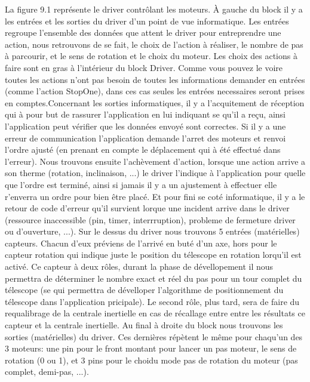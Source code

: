 La figure 9.1 représente le driver contrôlant les moteurs. À gauche du block il y a les entrées et les sorties du driver d'un point de vue informatique. \newline Les entrées regroupe l'ensemble des données que attent le driver pour entreprendre une action, nous retrouvons de se fait, le choix de l'action à réaliser, le nombre de pas à parcourir, et le sens de rotation et le choix du moteur. Les choix des actions à faire sont en gras à l'intérieur du block Driver. Comme vous pouvez le voire toutes les actions n'ont pas besoin de toutes les informations demander en entrées (comme l'action StopOne), dans ces cas seules les entrées necessaires seront prises en comptes.\newline Concernant les sorties informatiques, il y a l'acquitement de réception qui à pour but de rassurer l'application en lui indiquant se qu'il a reçu, ainsi l'application peut vérifier que les données envoyé sont correctes. Si il y a une erreur de communication l'application demande l'arret des moteurs et renvoi l'ordre ajusté (en prenant en compte le déplacement qui à été effectué dans l'erreur). Nous trouvons ensuite l'achèvement d'action, lorsque une action arrive a son therme (rotation, inclinaison, ...) le driver l'indique à l'application pour quelle que l'ordre est terminé, ainsi si jamais il y a un ajustement à effectuer elle r'enverra un ordre pour bien être placé. Et pour fini se coté informatique, il y a le retour de code d'erreur qu'il survient lorque une incident arrive dans le driver (ressource inaccessible (pin, timer, interrruption), probleme de fermeture driver ou d'ouverture, ...). \newline
Sur le dessus du driver nous trouvons 5 entrées (matérielles) capteurs. Chacun d'eux préviens de l'arrivé en buté d'un axe, hors pour le capteur rotation qui indique juste le position du télescope en rotation lorqu'il est activé. \newline Ce capteur à deux rôles, durant la phase de dévellopement il nous permettra de déterminer le nombre exact et réel du pas pour un tour complet du télescope (se qui permettra de dévelloper l'algorithme de positionnement du télescope dans l'application pricipale). Le second rôle, plus tard, sera de faire du requalibrage de la centrale inertielle en cas de récallage entre entre les résultats ce capteur et la centrale inertielle. \newline
Au final à droite du block nous trouvons les sorties (matérielles) du driver. Ces dernières répètent le même pour chaqu'un des 3 moteurs: une pin pour le front montant pour lancer un pas moteur, le sens de rotation (0 ou 1), et 3 pins pour le choidu mode pas de rotation du moteur (pas complet, demi-pas, ...). \newline
  
